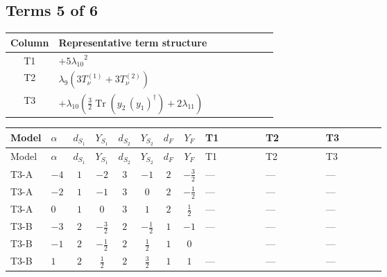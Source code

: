 \documentclass[8pt]{article}
\begin{document}
\begin{landscape}
\subsection*{Terms 5 of 6}
\begin{center}
\begin{tabular}{@{}c >{\raggedright\arraybackslash}p{0.82\linewidth}@{}}
\toprule
Column & Representative term structure \\
\midrule
T1 & \(\displaystyle +5 {\lambda_{10}}^2\) \\
\midrule
T2 & \(\displaystyle {\lambda_{9}} (3 T_{\nu}^{(1)}+3 T_{\nu}^{(2)})\) \\
\midrule
T3 & \(\displaystyle +{\lambda_{10}} \left(\frac{3}{2} \operatorname{Tr}\!\left({y_2}\,\left({y_1}\right)^{\dagger}\right)+2 {\lambda_{11}}\right)\) \\
\midrule
\bottomrule
\end{tabular}
\end{center}
\smallskip
\tiny
\begin{longtable}{@{}llcccccc >{\raggedright\arraybackslash}p{0.21\linewidth} >{\raggedright\arraybackslash}p{0.21\linewidth} >{\raggedright\arraybackslash}p{0.21\linewidth}@{}}
\toprule
Model & $\alpha$ & $d_{S_1}$ & $Y_{S_1}$ & $d_{S_2}$ & $Y_{S_2}$ & $d_F$ & $Y_F$ & T1 & T2 & T3 \\
\midrule
\endfirsthead
\toprule
Model & $\alpha$ & $d_{S_1}$ & $Y_{S_1}$ & $d_{S_2}$ & $Y_{S_2}$ & $d_F$ & $Y_F$ & T1 & T2 & T3 \\
\midrule
\endhead
T3-A & $-4$ & $1$ & $-2$ & $3$ & $-1$ & $2$ & $-\frac{3}{2}$ & --- & --- & --- \\
\midrule
T3-A & $-2$ & $1$ & $-1$ & $3$ & $0$ & $2$ & $-\frac{1}{2}$ & --- & --- & --- \\
\midrule
T3-A & $0$ & $1$ & $0$ & $3$ & $1$ & $2$ & $\frac{1}{2}$ & --- & --- & --- \\
\midrule
T3-B & $-3$ & $2$ & $-\frac{3}{2}$ & $2$ & $-\frac{1}{2}$ & $1$ & $-1$ & --- & --- & --- \\
\midrule
T3-B & $-1$ & $2$ & $-\frac{1}{2}$ & $2$ & $\frac{1}{2}$ & $1$ & $0$ & \scriptsize\adjustbox{max width=\linewidth}{$\begin{gathered} +5 {\lambda_{10}}^2 \\ +5 {\lambda_{11}}^2\end{gathered}$} & --- & --- \\
\midrule
T3-B & $1$ & $2$ & $\frac{1}{2}$ & $2$ & $\frac{3}{2}$ & $1$ & $1$ & --- & --- & --- \\
\midrule

\end{longtable}
\end{landscape}
\end{document}
